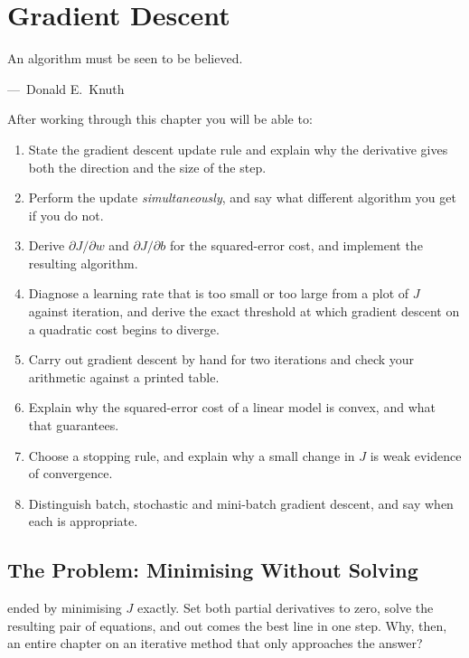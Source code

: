 
\chapter{Gradient Descent}
\label{ch:ch03}

\epigraph{An algorithm must be seen to be believed.}{---\ Donald E.\ Knuth}

\begin{chapterlearning}
After working through this chapter you will be able to:
\begin{enumerate}
  \item State the gradient descent update rule and explain why the derivative
        gives both the direction and the size of the step.
  \item Perform the update \emph{simultaneously}, and say what different
        algorithm you get if you do not.
  \item Derive $\partial J/\partial w$ and $\partial J/\partial b$ for the
        squared-error cost, and implement the resulting algorithm.
  \item Diagnose a learning rate that is too small or too large from a plot of
        $J$ against iteration, and derive the exact threshold at which gradient
        descent on a quadratic cost begins to diverge.
  \item Carry out gradient descent by hand for two iterations and check your
        arithmetic against a printed table.
  \item Explain why the squared-error cost of a linear model is convex, and
        what that guarantees.
  \item Choose a stopping rule, and explain why a small change in $J$ is weak
        evidence of convergence.
  \item Distinguish batch, stochastic and mini-batch gradient descent, and say
        when each is appropriate.
\end{enumerate}
\end{chapterlearning}

\section{The Problem: Minimising Without Solving}
\label{sec:minimising}

 ended by minimising $J$ exactly. Set both partial derivatives to
zero, solve the resulting pair of equations, and out comes the best line in one
step. Why, then, an entire chapter on an iterative method that only approaches
the answer?

